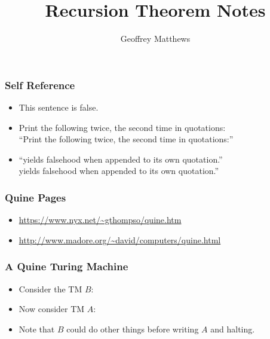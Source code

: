 \documentclass{beamer}
\title{Recursion Theorem Notes}
\author{Geoffrey Matthews}
\newcommand{\bfr}[1]{\begin{frame}[fragile]\frametitle{{ #1 }}}
\begin{document}
\begin{frame}
\maketitle

\end{frame}

\bfr{Self Reference}
\begin{itemize}
\item This sentence is false.\pause
\item Print the following twice, the second time in quotations:\\
  ``Print the following twice, the second time in quotations:''\pause
  \item ``yields falsehood when appended to its own quotation.''\\
  yields falsehood when appended to its own quotation.''
\end{itemize}

\end{frame}

\bfr{Quine Pages}
\begin{itemize}
\item  \url{https://www.nyx.net/~gthompso/quine.htm}
\item \url{http://www.madore.org/~david/computers/quine.html}
\end{itemize}
\end{frame}

\bfr{A Quine Turing Machine}
\begin{itemize}
\item Consider the TM $B$:
\item Now consider TM $A$:
  
\pause
\item Note that $B$ could do other things before writing $A$ and halting.
  \end{itemize}
\end{frame}
\end{document}
